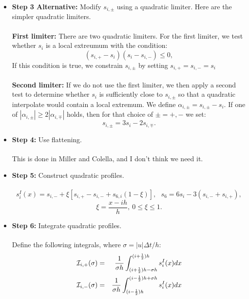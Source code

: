 \begin{itemize}
\item {\bf Step 3 Alternative:} Modify $s_{i,\pm}$ using a quadratic limiter.
Here are the simpler quadratic limiters.\\ \\
{\bf First limiter:} There are two quadratic limiters.  
For the first limiter, we test whether 
$s_i$ is a local extreumum with the condition:
\begin{equation}
\left(s_{i,+}-s_i\right)\left(s_i-s_{i,-}\right) \le 0,
\end{equation}
If this condition is true, we constrain $s_{i,\pm}$ by setting 
$s_{i,+} = s_{i,-} = s_i$\\ \\
{\bf Second limiter:} If we do not use the first limiter, we then apply a 
second test to determine 
whether $s_i$ is sufficiently close to $s_{i,\pm}$ so that a quadratic 
interpolate would contain a local extremum.  We define 
$\alpha_{i,\pm} = s_{i,\pm} - s_i$.  If one of $|\alpha_{i,\pm}| \ge 2|\alpha_{i,\mp}|$
holds, then for that choice of $\pm = +,-$ we set:
\begin{equation}
s_{i,\pm} = 3s_i - 2s_{i,\mp}.
\end{equation}
\item {\bf Step 4:} Use flattening.\\ \\
This is done in Miller and Colella, and I don't think we need it.
\item {\bf Step 5:} Construct quadratic profiles.\\ \\
\begin{equation}
s_i^I(x) = s_{i,-} + \xi\left[s_{i,+} - s_{i,-} + s_{6,i}(1-\xi)\right], ~~~ s_6 = 6s_{i} - 3\left(s_{i,-}+s_{i,+}\right),\label{Quadratic Interp}
\end{equation}
\begin{equation}
\xi = \frac{x - ih}{h}, ~ 0 \le \xi \le 1.
\end{equation}
\item {\bf Step 6:} Integrate quadratic profiles.\\ \\
Define the following integrals, where $\sigma = |u|\Delta t/h$:
\begin{eqnarray}
\mathcal{I}_{i,+}(\sigma) &=& \frac{1}{\sigma h}\int_{(i+\frac{1}{2})h-\sigma h}^{(i+\frac{1}{2})h}s_i^I(x)dx \\
\mathcal{I}_{i,-}(\sigma) &=& \frac{1}{\sigma h}\int_{(i-\frac{1}{2})h}^{(i-\frac{1}{2})h+\sigma h}s_i^I(x)dx
\end{eqnarray}

\end{itemize}
